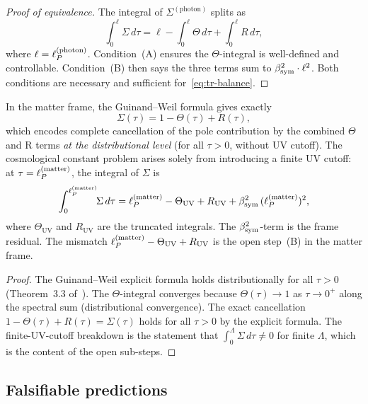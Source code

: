 \begin{proof}[Proof of equivalence]
The integral of $\Sigma^{(\mathrm{photon})}$ splits as
\[
  \int_0^{\ell} \Sigma\,d\tau
  = \ell - \int_0^\ell \Theta\,d\tau + \int_0^\ell R\,d\tau,
\]
where $\ell = \ell_P^{(\mathrm{photon})}$.
Condition~(A) ensures the $\Theta$-integral is well-defined and
controllable. Condition~(B) then says the three terms sum to
$\beta_{\mathrm{sym}}^2\cdot\ell^2$.
Both conditions are necessary and sufficient for~\eqref{eq:tr-balance}.
\end{proof}

\begin{theorem}
\label{thm:partial-cancel}
In the matter frame, the Guinand--Weil formula gives exactly
\[
  \Sigma(\tau) = 1 - \Theta(\tau) + R(\tau),
\]
which encodes complete cancellation of the pole contribution by the
combined $\Theta$ and R terms \emph{at the distributional level} (for all
$\tau > 0$, without UV cutoff). The cosmological constant problem
arises solely from introducing a finite UV cutoff: at
$\tau = \ell_P^{(\mathrm{matter})}$, the integral of $\Sigma$ is
\[
  \int_0^{\ell_P^{(\mathrm{matter})}}\!\!\Sigma\,d\tau
  = \ell_P^{(\mathrm{matter})} - \Theta_{\mathrm{UV}}
  + R_{\mathrm{UV}} + \beta_{\mathrm{sym}}^2\,(\ell_P^{(\mathrm{matter})})^2,
\]
where $\Theta_{\mathrm{UV}}$ and $R_{\mathrm{UV}}$ are the truncated
integrals. The $\beta_{\mathrm{sym}}^2$-term is the frame residual. The mismatch
$\ell_P^{(\mathrm{matter})} - \Theta_{\mathrm{UV}} + R_{\mathrm{UV}}$
is the open step~(B) in the matter frame.
\end{theorem}

\begin{proof}
The Guinand--Weil explicit formula holds distributionally for all
$\tau > 0$ (Theorem~3.3 of~\cite{brendecke2026rh}). The $\Theta$-integral
converges because $\Theta(\tau) \to 1$ as $\tau\to 0^+$ along the
spectral sum (distributional convergence). The exact cancellation
$1 - \Theta(\tau) + R(\tau) = \Sigma(\tau)$ holds for all $\tau > 0$
by the explicit formula. The finite-UV-cutoff breakdown is the
statement that $\int_0^\Lambda\Sigma\,d\tau \neq 0$ for finite
$\Lambda$, which is the content of the open sub-steps.
\end{proof}

\subsection{Falsifiable predictions}
\label{sec:falsifiable}

